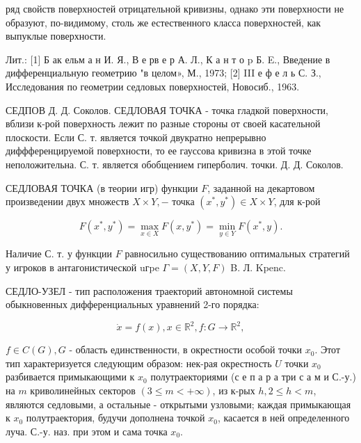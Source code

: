 \documentclass[10pt]{article}
\begin{document}
ряд свойств поверхностей отрицательной кривизны, однако эти поверхности не образуют, по-видимому, столь же естественного класса поверхностей, как выпуклые поверхности.



Лит.: [1] Б ак ельм а н И. Я., В е рв е р А. Л., К а н т о p Б. E., Введение в дифференциальную геометрию "в целом», М., 1973; [2] III е ф е л ь С. З., Исследования по геометрии седловых поверхностей, Новосиб., 1963.



СЕДПОВ Д. Д. Соколов. СЕДЛОВАЯ ТОЧКА - точка гладкой поверхности, вблизи к-рой поверхность лежит по разные стороны от своей касательной плоскости. Если С. т. является точкой двукратно непрерывно диффференцируемой поверхности, то ее гауссова кривизна в этой точке неположительна. С. т. является обобщением гиперболич. точки. Д. Д. Соколов.



СЕДЛОВАЯ ТОЧКА (в теории игр) функции $F$, заданной на декартовом произведении двух множеств $X \times Y,-$ точка $\left(x^{*}, y^{*}\right) \in X \times Y$, для к-рой



\[

F\left(x^{*}, y^{*}\right)=\max _{x \in X} F\left(x, y^{*}\right)=\min _{y \in Y} F\left(x^{*}, y\right) .

\]



Наличие С. т. у функции $F$ равносильно существованию оптимальных стратегий у игроков в антагонистической uгpe $\Gamma=(X, Y, F)$ B. Л. Kpenc.



СЕДЛО-УЗЕЛ - тип расположения траекторий автономной системы обыкновенных дифференциальных уравнений 2-го порядка:



\[

\dot{x}=f(x), x \in \mathbb{R}^{2}, f: G \rightarrow \mathbb{R}^{2},

\]



$f \in C(G), G$ - область единственности, в окрестности особой точки $x_{0}$. Этот тип характеризуется следующим образом: нек-рая окрестность $U$ точки $x_{0}$ разбивается примыкающими к $x_{0}$ полутраекториями (с е п а р а три с а м и С.-у.) на $m$ криволинейных секторов $(3 \leqslant m<+\infty)$, из к-рых $h, 2 \leqslant h<m$, являются седловыми, а остальные - открытыми узловыми; каждая примыкающая к $x_{0}$ полутраектория, будучи дополнена точкой $x_{0}$, касается в ней определенного луча. С.-у. наз. при этом и сама точка $x_{0}$.
\end{document}
